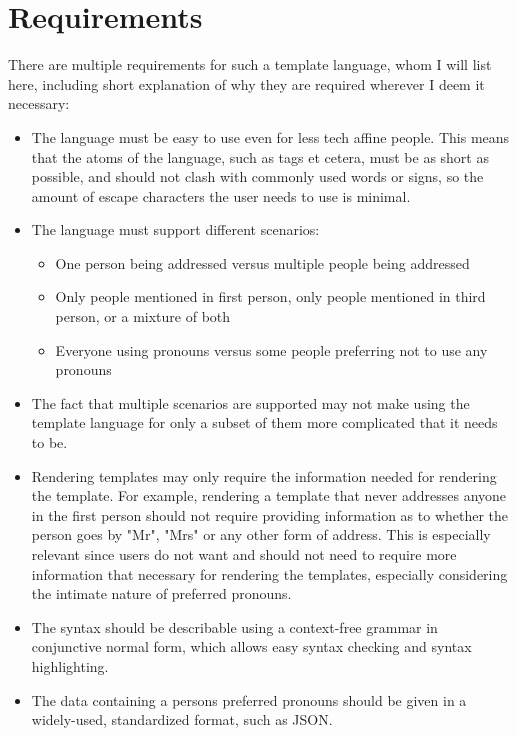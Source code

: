 \documentclass{article}
\begin{document}
\section{Requirements}

    There are multiple requirements for such a template language, whom I will list here, including short explanation of why they are required wherever I deem it necessary:

    \begin{itemize}
        \item The language must be easy to use even for less tech affine people.
              This means that the atoms of the language, such as tags et cetera, must be as short as possible, and should not clash with commonly used words or signs, so the amount of escape characters the user needs to use is minimal.
        \item The language must support different scenarios:
        \begin{itemize}
            \item One person being addressed versus multiple people being addressed
            \item Only people mentioned in first person, only people mentioned in third person, or a mixture of both
            \item Everyone using pronouns versus some people preferring not to use any pronouns
        \end{itemize}
        \item The fact that multiple scenarios are supported may not make using the template language for only a subset of them more complicated that it needs to be.
        \item Rendering templates may only require the information needed for rendering the template.
        For example, rendering a template that never addresses anyone in the first person should not require providing information as to whether the person goes by "Mr", "Mrs" or any other form of address.
        This is especially relevant since users do not want and should not need to require more information that necessary for rendering the templates, especially considering the intimate nature of preferred pronouns.
        \item The syntax should be describable using a context-free grammar in conjunctive normal form, which allows easy syntax checking and syntax highlighting.
        \item The data containing a persons preferred pronouns should be given in a widely-used, standardized format, such as JSON.
    \end{itemize}
\end{document}
